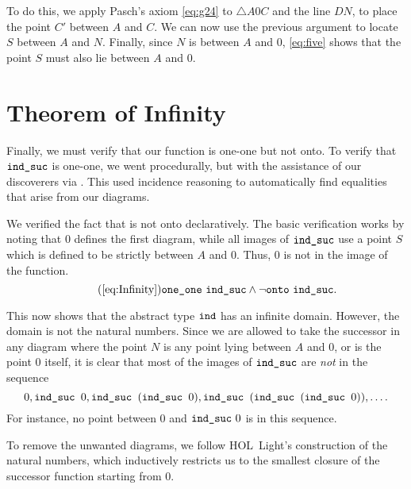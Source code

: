 To do this, we apply Pasch's axiom \eqref{eq:g24} to $\triangle A0C$ and the line $DN$, to place the point $C'$ between $A$ and $C$. We can now use the previous argument to locate $S$ between $A$ and $N$. Finally, since $N$ is between $A$ and $0$, \ref{eq:five} shows that the point $S$ must also lie between $A$ and $0$. 

\section{Theorem of Infinity}
Finally, we must verify that our function is one-one but not onto. To verify that $\texttt{ind\_suc}$ is one-one, we went procedurally, but with the assistance of our discoverers via . This used incidence reasoning to automatically find equalities that arise from our diagrams. 

We verified the fact that  is not onto declaratively. The basic verification works by noting that $0$ defines the first diagram, while all images of $\texttt{ind\_suc}$ use a point $S$ which is defined to be strictly between $A$ and $0$. Thus, $0$ is not in the image of the function.
\begin{equation}
\tag{\ref{eq:Infinity}}
\code{one\_one}\ \code{ind\_suc} \wedge \neg\code{onto}\ \code{ind\_suc}.
\end{equation}

This now shows that the abstract type $\texttt{ind}$ has an infinite domain. However, the domain is not the natural numbers. Since we are allowed to take the successor in any diagram where the point $N$ is any point lying between $A$ and $0$, or is the point $0$ itself, it is clear that most of the images of $\texttt{ind\_suc}$ are \emph{not} in the sequence
\begin{displaymath}
0, \texttt{ind\_suc } 0, \texttt{ind\_suc }(\texttt{ind\_suc } 0), \texttt{ind\_suc }(\texttt{ind\_suc }(\texttt{ind\_suc } 0)),  \ldots.
\end{displaymath}
For instance, no point between $0$ and $\texttt{ind\_suc}\ 0$ is in this sequence.

To remove the unwanted diagrams, we follow HOL~Light's construction of the natural numbers, which inductively restricts us to the smallest closure of the successor function starting from $0$. 


